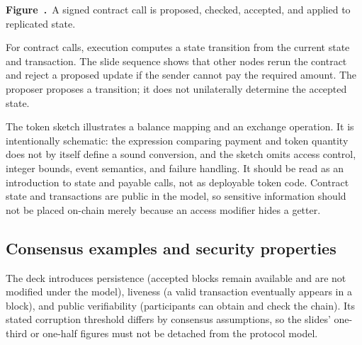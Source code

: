 \documentclass[11pt,a4paper]{article}
\numberwithin{figure}{section}
\newcommand{\diagramcaption}[1]{\par\smallskip\refstepcounter{figure}\begin{center}\small\textbf{Figure~\thefigure.}~#1\end{center}}
\begin{document}
\begin{center}\end{center}
\diagramcaption{A signed contract call is proposed, checked, accepted, and applied to replicated state.}
For contract calls, execution computes a state transition from the current state and transaction. The slide sequence shows that other nodes rerun the contract and reject a proposed update if the sender cannot pay the required amount. The proposer proposes a transition; it does not unilaterally determine the accepted state.

The token sketch illustrates a balance mapping and an exchange operation. It is intentionally schematic: the expression comparing payment and token quantity does not by itself define a sound conversion, and the sketch omits access control, integer bounds, event semantics, and failure handling. It should be read as an introduction to state and payable calls, not as deployable token code. Contract state and transactions are public in the model, so sensitive information should not be placed on-chain merely because an access modifier hides a getter.

\subsection{Consensus examples and security properties}
The deck introduces persistence (accepted blocks remain available and are not modified under the model), liveness (a valid transaction eventually appears in a block), and public verifiability (participants can obtain and check the chain). Its stated corruption threshold differs by consensus assumptions, so the slides' one-third or one-half figures must not be detached from the protocol model.
\end{document}
